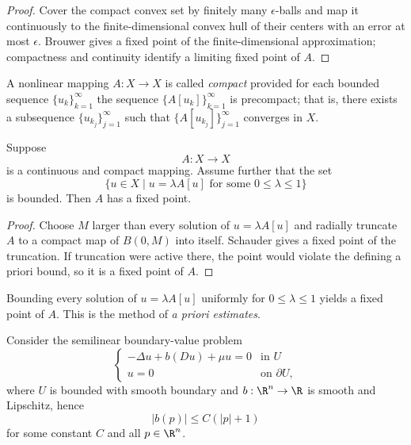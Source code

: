 \begin{proof}
\sketch Cover the compact convex set by finitely many $\epsilon$-balls and map it continuously to the finite-dimensional convex hull of their centers with an error at most $\epsilon$. Brouwer gives a fixed point of the finite-dimensional approximation; compactness and continuity identify a limiting fixed point of $A$.
\end{proof}

\begin{definition}
\label{def:compact-mapping-banach-space}
A nonlinear mapping $A : X \to X$ is called \textit{compact} provided for each bounded sequence $\{u_k\}_{k=1}^{\infty}$ the sequence $\{A[u_k]\}_{k=1}^{\infty}$ is precompact; that is, there exists a subsequence $\{u_{k_j}\}_{j=1}^{\infty}$ such that $\{A[u_{k_j}]\}_{j=1}^{\infty}$ converges in $X$.
\end{definition}

\begin{theorem}
\label{thm:schaefers-fixed-point-theorem}
Suppose
\[
A : X \to X
\]
is a continuous and compact mapping. Assume further that the set
\[
\{u \in X \mid u = \lambda A[u] \text{ for some } 0 \le \lambda \le 1\}
\]
is bounded. Then $A$ has a fixed point.
\end{theorem}

\begin{proof}
\sketch Choose $M$ larger than every solution of $u=\lambda A[u]$ and radially truncate $A$ to a compact map of $B(0,M)$ into itself. Schauder gives a fixed point of the truncation. If truncation were active there, the point would violate the defining a priori bound, so it is a fixed point of $A$.
\end{proof}

\begin{remark}
\label{rem:a-priori-estimates-method}
Bounding every solution of $u=\lambda A[u]$ uniformly for $0\leq\lambda\leq1$ yields a fixed point of $A$. This is the method of \textit{a priori estimates}.
\end{remark}

\begin{example}
\label{ex:quasilinear-elliptic-schaefer}
Consider the semilinear boundary-value problem
\[
\begin{cases}
-\Delta u + b(Du) + \mu u = 0 & \text{in } U \\
u = 0 & \text{on } \partial U,
\end{cases}
\tag{21}
\]
where $U$ is bounded with smooth boundary and $b:\R^n\to\R$ is smooth and Lipschitz, hence
\[
|b(p)| \le C(|p| + 1)
\tag{22}
\]
for some constant $C$ and all $p \in \R^n$.
\end{example}

